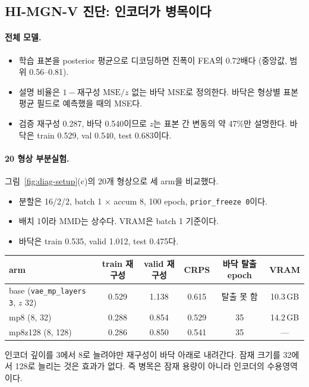 \documentclass[11pt]{article}
\newcommand{\code}[1]{\texttt{#1}}
\begin{document}
\subsection{HI-MGN-V 진단: 인코더가 병목이다}\label{sec:diag-v}

\paragraph{전체 모델.}
\begin{itemize}
\item 학습 표본을 posterior 평균으로 디코딩하면 진폭이 FEA의 0.72배다
  (중앙값, 범위 0.56--0.81).
\item 설명 비율은 $1-\text{재구성 MSE}/\text{$z$ 없는 바닥 MSE}$로 정의한다.
  바닥은 형상별 표본 평균 필드로 예측했을 때의 MSE다.
\item 검증 재구성 0.287, 바닥 0.540이므로 $z$는 표본 간 변동의 약 47\%만
  설명한다. 바닥은 train 0.529, val 0.540, test 0.683이다.
\end{itemize}

\paragraph{20 형상 부분실험.} 그림~\ref{fig:diag-setup}(c)의 20개 형상으로
세 arm을 비교했다.
\begin{itemize}
\item 분할은 16/2/2, batch 1 $\times$ accum 8, 100 epoch, \code{prior\_freeze 0}이다.
\item 배치 1이라 MMD는 상수다. VRAM은 batch 1 기준이다.
\item 바닥은 train 0.535, valid 1.012, test 0.475다.
\end{itemize}
\begin{center}
\small
\begin{tabular}{@{}lccccc@{}}
\toprule
arm & train 재구성 & valid 재구성 & CRPS & 바닥 탈출 epoch & VRAM \\
\midrule
base (\code{vae\_mp\_layers 3}, $z$ 32) & 0.529 & 1.138 & 0.615 & 탈출 못 함 & 10.3\,GB \\
mp8 (8, 32) & 0.288 & 0.854 & 0.529 & 35 & 14.2\,GB \\
mp8z128 (8, 128) & 0.286 & 0.850 & 0.541 & 35 & --- \\
\bottomrule
\end{tabular}
\end{center}
인코더 깊이를 3에서 8로 늘려야만 재구성이 바닥 아래로 내려간다. 잠재 크기를
32에서 128로 늘리는 것은 효과가 없다. 즉 병목은 잠재 용량이 아니라 인코더의
수용영역이다.
\end{document}
